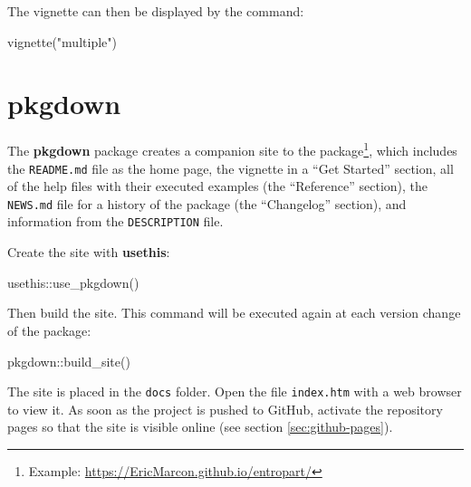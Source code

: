 \documentclass[
  12pt,
  american,
  a4paper,
  extrafontsizes,onecolumn,openright
  ]{memoir}
\newenvironment{Shaded}{\begin{snugshade}}{\end{snugshade}}
\newcommand{\FunctionTok}[1]{\textcolor[rgb]{0.00,0.00,0.00}{#1}}
\newcommand{\NormalTok}[1]{#1}
\newcommand{\SpecialCharTok}[1]{\textcolor[rgb]{0.00,0.00,0.00}{#1}}
\newcommand{\StringTok}[1]{\textcolor[rgb]{0.31,0.60,0.02}{#1}}
\begin{document}
\normalsize

The vignette can then be displayed by the command:

\scriptsize

\begin{Shaded}
\begin{Highlighting}[]
\FunctionTok{vignette}\NormalTok{(}\StringTok{"multiple"}\NormalTok{)}
\end{Highlighting}
\end{Shaded}

\normalsize

\hypertarget{pkgdown}{%
\section{pkgdown}\label{pkgdown}}

The \textbf{pkgdown} package creates a companion site to the package\footnote{Example: \url{https://EricMarcon.github.io/entropart/}}, which includes the \texttt{README.md} file as the home page, the vignette in a \enquote{Get Started} section, all of the help files with their executed examples (the \enquote{Reference} section), the \texttt{NEWS.md} file for a history of the package (the \enquote{Changelog} section), and information from the \texttt{DESCRIPTION} file.

Create the site with \textbf{usethis}:

\scriptsize

\begin{Shaded}
\begin{Highlighting}[]
\NormalTok{usethis}\SpecialCharTok{::}\FunctionTok{use\_pkgdown}\NormalTok{()}
\end{Highlighting}
\end{Shaded}

\normalsize

Then build the site.
This command will be executed again at each version change of the package:

\scriptsize

\begin{Shaded}
\begin{Highlighting}[]
\NormalTok{pkgdown}\SpecialCharTok{::}\FunctionTok{build\_site}\NormalTok{()}
\end{Highlighting}
\end{Shaded}

\normalsize

The site is placed in the \texttt{docs} folder.
Open the file \texttt{index.htm} with a web browser to view it.
As soon as the project is pushed to GitHub, activate the repository pages so that the site is visible online (see section \ref{sec:github-pages}).
\end{document}
